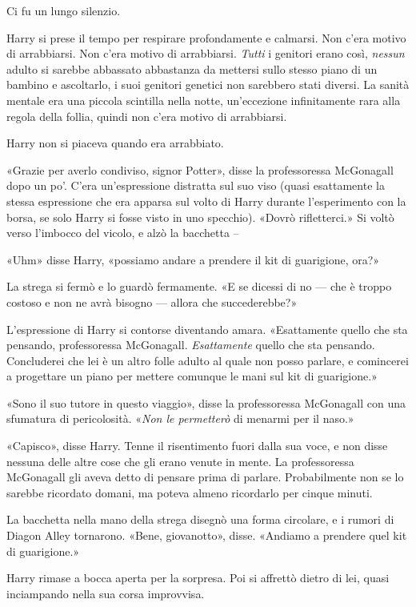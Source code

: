 Ci fu un lungo silenzio.

Harry si prese il tempo per respirare profondamente e calmarsi. Non c’era motivo di arrabbiarsi. Non c’era motivo di arrabbiarsi. \textit{Tutti} i genitori erano così, \textit{nessun} adulto si sarebbe abbassato abbastanza da mettersi sullo stesso piano di un bambino e ascoltarlo, i suoi genitori genetici non sarebbero stati diversi. La sanità mentale era una piccola scintilla nella notte, un’eccezione infinitamente rara alla regola della follia, quindi non c’era motivo di arrabbiarsi.

Harry non si piaceva quando era arrabbiato.

«Grazie per averlo condiviso, signor Potter», disse la professoressa McGonagall dopo un po’. C’era un’espressione distratta sul suo viso (quasi esattamente la stessa espressione che era apparsa sul volto di Harry durante l’esperimento con la borsa, se solo Harry si fosse visto in uno specchio). «Dovrò rifletterci.» Si voltò verso l’imbocco del vicolo, e alzò la bacchetta –

«Uhm» disse Harry, «possiamo andare a prendere il kit di guarigione, ora?»

La strega si fermò e lo guardò fermamente. «E se dicessi di no — che è troppo costoso e non ne avrà bisogno — allora che succederebbe?»

L’espressione di Harry si contorse diventando amara. «Esattamente quello che sta pensando, professoressa McGonagall. \textit{Esattamente} quello che sta pensando. Concluderei che lei è un altro folle adulto al quale non posso parlare, e comincerei a progettare un piano per mettere comunque le mani sul kit di guarigione.»

«Sono il suo tutore in questo viaggio», disse la professoressa McGonagall con una sfumatura di pericolosità. «\textit{Non le permetterò} di menarmi per il naso.»

«Capisco», disse Harry. Tenne il risentimento fuori dalla sua voce, e non disse nessuna delle altre cose che gli erano venute in mente. La professoressa McGonagall gli aveva detto di pensare prima di parlare. Probabilmente non se lo sarebbe ricordato domani, ma poteva almeno ricordarlo per cinque minuti.

La bacchetta nella mano della strega disegnò una forma circolare, e i rumori di Diagon Alley tornarono. «Bene, giovanotto», disse. «Andiamo a prendere quel kit di guarigione.»

Harry rimase a bocca aperta per la sorpresa. Poi si affrettò dietro di lei, quasi inciampando nella sua corsa improvvisa.

